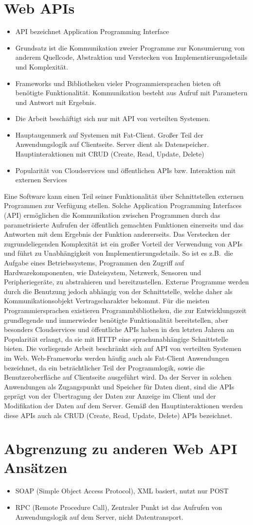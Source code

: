 \section{Web APIs}
\begin{itemize}
  \item API bezeichnet Application Programming Interface
  \item Grundsatz ist die Kommunikation zweier Programme zur Konsumierung von anderem Quellcode, Abstraktion und Verstecken von Implementierungsdetails und Komplexität.
  \item Frameworks und Bibliotheken vieler Programmiersprachen bieten oft benötigte Funktionalität. Kommunikation besteht aus Aufruf mit Parametern und Antwort mit Ergebnis.
  \item Die Arbeit beschäftigt sich nur mit API von verteilten Systemen.
  \item Hauptaugenmerk auf Systemen mit Fat-Client. Großer Teil der Anwendungslogik auf Clientseite. Server dient als Datenspeicher. Hauptinteraktionen mit CRUD (Create, Read, Update, Delete)
  \item Popularität von Cloudservices und öffentlichen APIs bzw. Interaktion mit externen Services
\end{itemize}
Eine Software kann einen Teil seiner Funktionalität über Schnittstellen externen Programmen zur Verfügung stellen.
Solche Application Programming Interfaces (API) ermöglichen die Kommunikation zwischen Programmen durch das parametrisierte Aufrufen der öffentlich gemachten Funktionen einerseits und das Antworten mit dem Ergebnis der Funktion andererseits.
Das Verstecken der zugrundeliegenden Komplexität ist ein großer Vorteil der Verwendung von APIs und führt zu Unabhängigkeit von Implementierungsdetails.
So ist es z.B.\ die Aufgabe eines Betriebssystems, Programmen den Zugriff auf Hardwarekomponenten, wie Dateisystem, Netzwerk, Sensoren und Peripheriegeräte, zu abstrahieren und bereitzustellen.
Externe Programme werden durch die Benutzung jedoch abhängig von der Schnittstelle, welche daher als Kommunikationsobjekt Vertragscharakter bekommt.
Für die meisten Programmiersprachen existieren Programmbibliotheken, die zur Entwicklungszeit grundlegende und immerwieder benötigte Funktionalität bereitstellen, aber besonders Cloudservices und öffentliche APIs haben in den letzten Jahren an Popularität erlangt, da sie mit HTTP eine sprachunabhängige Schnittstelle bieten.
Die vorliegende Arbeit beschränkt sich auf API von verteilten Systemen im Web.
Web-Frameworks werden häufig auch als Fat-Client Anwendungen bezeichnet, da ein beträchtlicher Teil der Programmlogik, sowie die Benutzeroberfläche auf Clientseite ausgeführt wird.
Da der Server in solchen Anwendungen als Zugangspunkt und Speicher für Daten dient, sind die APIs geprägt von der Übertragung der Daten zur Anzeige im Client und der Modifikation der Daten auf dem Server.
Gemäß den Hauptinteraktionen werden diese APIs auch als CRUD (Create, Read, Update, Delete) APIs bezeichnet.

\section{Abgrenzung zu anderen Web API Ansätzen}
\begin{itemize}
  \item SOAP (Simple Object Access Protocol), XML basiert, nutzt nur POST
  \item RPC (Remote Procedure Call), Zentraler Punkt ist das Aufrufen von Anwendungslogik auf dem Server, nicht Datentransport.
\end{itemize}
